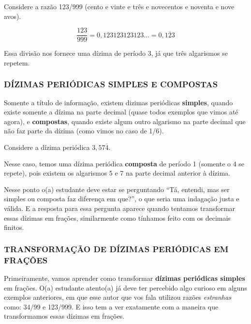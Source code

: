 \begin{exemplo}
    Considere a razão 123/999 (cento e vinte e três e novecentos e noventa e nove avos).

    \begin{equation}
        \frac{123}{999}=0,123123123123\dots=0,\overline{123}
    \end{equation}
    
    Essa divisão nos fornece uma dízima de período 3, já que três algarismos se repetem.
\end{exemplo}

\subsubsection{DÍZIMAS PERIÓDICAS SIMPLES E COMPOSTAS}

Somente a título de informação, existem dizimas periódicas \textbf{simples}, quando existe somente a dízima na parte decimal (quase todos exemplos que vimos até agora), e \textbf{compostas}, quando existe algum outro algarismo na parte decimal que não faz parte da dízima (como vimos no caso de 1/6).

\begin{exemplo}
    Considere a dízima periódica \(3,57\overline{4}\).

    \vspace{0.5cm}

    Nesse caso, temos uma dízima periódica \textbf{composta} de período 1 (somente o 4 se repete), pois existem os algarismos 5 e 7 na parte decimal anterior à dízima.
\end{exemplo}

Nesse ponto o(a) estudante deve estar se perguntando ``Tá, entendi, mas ser simples ou composta faz diferença em que?'', o que seria uma indagação justa e válida. E a resposta para essa pergunta aparece quando tentamos transformar essas dízimas em frações, similarmente como tínhamos feito com os decimais finitos.

\subsubsection{TRANSFORMAÇÃO DE DÍZIMAS PERIÓDICAS EM FRAÇÕES}

Primeiramente, vamos aprender como transformar \textbf{dízimas periódicas simples} em frações. O(a) estudante atento(a) já deve ter percebido algo curioso em alguns exemplos anteriores, em que esse autor que vos fala utilizou razões \textit{estranhas} como: 34/99 e 123/999. E isso tem a ver exatamente com a maneira que transformamos essas dízimas em frações.

